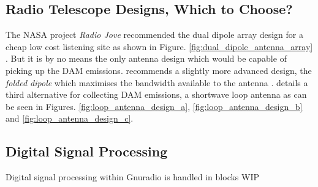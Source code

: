 \documentclass[runningheads,a4paper]{llncs}
\begin{document}
\subsection*{Radio Telescope Designs, Which to Choose?}
The NASA project \textit{Radio Jove} recommended the dual dipole array design for a cheap low cost listening site as shown in Figure. \ref{fig:dual_dipole_antenna_array} \citep{nasa12}. But it is by no means the only antenna design which would be capable of picking up the \gls{DAM} emissions. \cite{wilkinson94} recommends a slightly more advanced design, the \textit{folded dipole} which maximises the bandwidth available to the antenna \citep{wilkinson94}. \cite{greef-12} details a third alternative for collecting \gls{DAM} emissions, a shortwave loop antenna as can be seen in Figures. \ref{fig:loop_antenna_design_a}, \ref{fig:loop_antenna_design_b} and \ref{fig:loop_antenna_design_c}.

\subsection*{Digital Signal Processing}
Digital signal processing within Gnuradio is handled in blocks WIP
\end{document}
